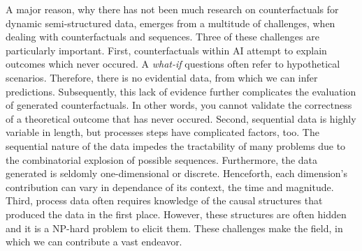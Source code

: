 \documentclass[./../../paper.tex]{subfiles}
\begin{document}
A major reason, why there has not been much research on counterfactuals for dynamic semi-structured data, emerges from a multitude of challenges, when dealing with counterfactuals and sequences.
Three of these challenges are particularly important. First, counterfactuals within AI attempt to explain outcomes which never occured. A \emph{what-if} questions often refer to hypothetical scenarios. Therefore, there is no evidential data, from which we can infer predictions. Subsequently, this lack of evidence further complicates the evaluation of generated counterfactuals. In other words, you cannot validate the correctness of a theoretical outcome that has never occured.
Second, sequential data is highly variable in length, but processes steps have complicated factors, too\needscite{}. The sequential nature of the data impedes the tractability of many problems due to the combinatorial explosion of possible sequences. Furthermore, the data generated is seldomly one-dimensional or discrete. Henceforth, each dimension's contribution can vary in dependance of its context, the time and magnitude.
Third, process data often requires knowledge of the causal structures that produced the data in the first place. However, these structures are often hidden and it is a NP-hard problem to elicit them. 
These challenges make the field, in which we can contribute a vast endeavor. 
\end{document}
